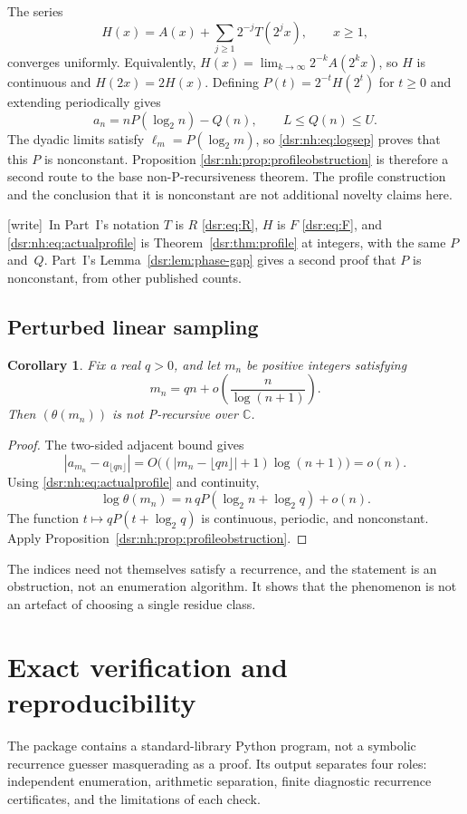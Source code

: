 \documentclass[11pt,a4paper]{article}
\numberwithin{equation}{section}
\newtheorem{corollary}[theorem]{Corollary}
\theoremstyle{definition}
\theoremstyle{remark}
\newcommand{\abs}[1]{\left|#1\right|}
\newcommand{\wtag}{\textup{[write]}}
\newcommand{\C}{\mathbb C}
\newcommand{\tht}{\theta}
\theoremstyle{definition}
\theoremstyle{plain}
\begin{document}
The series
\begin{equation}
H(x)=A(x)+\sum_{j\ge1}2^{-j}T(2^jx),\qquad x\ge1,
\label{dsr:nh:eq:H}
\end{equation}
converges uniformly. Equivalently, $H(x)=\lim_{k\to\infty}2^{-k}A(2^kx)$,
so $H$ is continuous and $H(2x)=2H(x)$. Defining
$P(t)=2^{-t}H(2^t)$ for $t\ge0$ and extending periodically gives
\begin{equation}
a_n=nP(\log_2 n)-Q(n),\qquad L\le Q(n)\le U.
\label{dsr:nh:eq:actualprofile}
\end{equation}
The dyadic limits satisfy $\ell_m=P(\log_2 m)$, so
\eqref{dsr:nh:eq:logsep} proves that this $P$ is nonconstant. Proposition
\ref{dsr:nh:prop:profileobstruction} is therefore a second route to the base
non-P-recursiveness theorem. The profile construction and the conclusion
that it is nonconstant are not additional novelty claims here.

\wtag\ In Part~I's notation $T$ is $R$ \eqref{dsr:eq:R}, $H$ is $F$
\eqref{dsr:eq:F}, and \eqref{dsr:nh:eq:actualprofile} is
Theorem~\ref{dsr:thm:profile} at integers, with the same $P$ and~$Q$.
Part~I's Lemma~\ref{dsr:lem:phase-gap} gives a second proof that $P$ is
nonconstant, from other published counts.

\subsection{Perturbed linear sampling}
\begin{corollary}
\label{dsr:nh:cor:perturbedsampling}
Fix a real $q>0$, and let $m_n$ be positive integers satisfying
\[
m_n=qn+o\left(\frac{n}{\log(n+1)}\right).
\]
Then $(\tht(m_n))$ is not P-recursive over $\C$.
\end{corollary}
\begin{proof}
The two-sided adjacent bound gives
\[
\abs{a_{m_n}-a_{\lfloor qn\rfloor}}
=O\bigl((|m_n-\lfloor qn\rfloor|+1)\log(n+1)\bigr)=o(n).
\]
Using \eqref{dsr:nh:eq:actualprofile} and continuity,
\[
\log\tht(m_n)
=n\,qP(\log_2 n+\log_2 q)+o(n).
\]
The function $t\mapsto qP(t+\log_2 q)$ is continuous, periodic, and
nonconstant. Apply Proposition~\ref{dsr:nh:prop:profileobstruction}.
\end{proof}
The indices need not themselves satisfy a recurrence, and the statement
is an obstruction, not an enumeration algorithm. It shows that the
phenomenon is not an artefact of choosing a single residue class.

\section{Exact verification and reproducibility}
\label{dsr:nh:sec:verification}
The package contains a standard-library Python program, not a symbolic
recurrence guesser masquerading as a proof. Its output separates four roles:
independent enumeration, arithmetic separation, finite diagnostic recurrence
certificates, and the limitations of each check.
\end{document}
